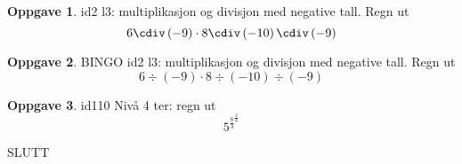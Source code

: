 \documentclass[12pt, norsk, a4paper]{article}
\theoremstyle{definition}
\newtheorem{oppgave}{Oppgave}
\begin{document}
\begin{oppgave} id2  l3: multiplikasjon og divisjon med negative tall. Regn ut \[ 6 \cdiv \left(-9\right) \cdot 8 \cdiv \left(-10\right) \cdiv \left(-9\right) \] \vspace{3mm}\end{oppgave}

\begin{oppgave} BINGO id2  l3: multiplikasjon og divisjon med negative tall. Regn ut \[ 6 \div \left(-9\right) \cdot 8 \div \left(-10\right) \div \left(-9\right) \] \vspace{3mm}\end{oppgave}

\begin{oppgave} id110 Nivå 4 ter: regn ut \[ 5^{\frac{8}{3}}^{\frac{3}{8}} \] \vspace{3mm}\end{oppgave}

\noindent SLUTT
\end{document}

